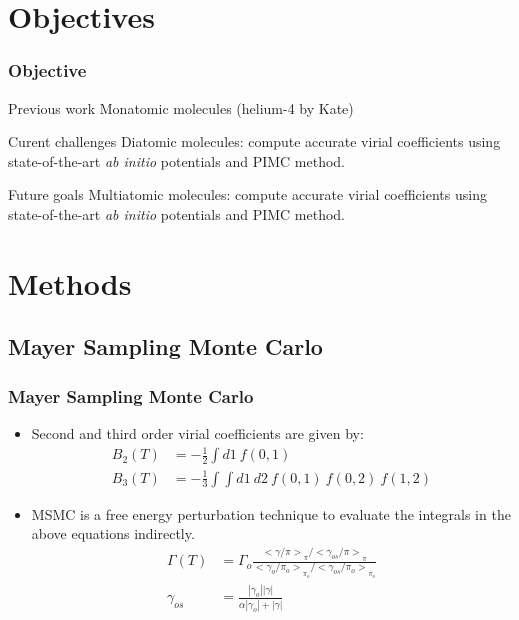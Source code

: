 \documentclass[xcolor=svgnames]{beamer}
\DeclareRobustCommand{\abinitio}[0]{\emph{ab initio}}
\begin{document}
    \section{Objectives}
        \begin{frame}
            \frametitle{Objective}
            \begin{block}{Previous work}
                Monatomic molecules (helium-4 by Kate)
            \end{block}
            \begin{block}{Curent challenges}
                \alert<2->{Diatomic molecules: compute accurate virial coefficients using state-of-the-art \abinitio{} potentials and PIMC method.}
            \end{block}
            \begin{block}{Future goals}
                Multiatomic molecules: compute accurate virial coefficients using state-of-the-art \abinitio{} potentials and PIMC method.
            \end{block}
        \end{frame}
	\section{Methods}
	\subsection{Mayer Sampling Monte Carlo}
        \begin{frame}
            \frametitle{Mayer Sampling Monte Carlo}
            \begin{itemize}
            \justifying
                \item Second and third order virial coefficients are given by:
                \begin{equation*}
                    \begin{aligned}
                        B_2(T) &= -\frac{1}{2} \displaystyle\int d1 ~ f(0,1)\\
                        B_3(T) &= -\frac{1}{3} \displaystyle\int \int d1~d2~f(0,1)~f(0,2)~f(1,2)
                    \end{aligned}
                \end{equation*}
                \item MSMC is a free energy perturbation technique to evaluate the integrals in the above equations indirectly.
                \begin{equation*}
                    \label{eq:MSMCworking}
                    \begin{aligned}
                        \Gamma (T) &= \Gamma_o \frac{{<\gamma/\pi>}_\pi / {<\gamma_{os}/\pi>}_\pi}{{<\gamma_o/\pi_o>}_{\pi_o} / {<\gamma_{os}/\pi_o>}_{\pi_o}}\\
                        \gamma_{os} &= \frac{|\gamma_o||\gamma|}{\alpha |\gamma_o| + |\gamma|}
                    \end{aligned}
                \end{equation*}
            \end{itemize}
        \end{frame}
\end{document}
